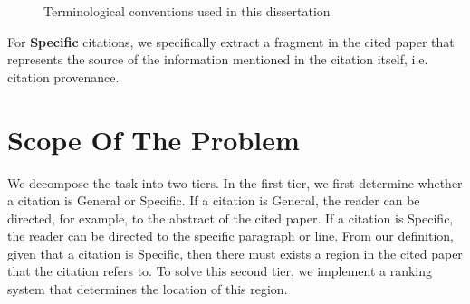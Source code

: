 \begin{figure}[h]
\label{fig:terminology}
\caption{Terminological conventions used in this dissertation}
\end{figure}

For \textbf{Specific} citations, we specifically extract a fragment in the cited paper that represents the source of the information mentioned in the citation itself, i.e. citation provenance.

\section{Scope Of The Problem}
We decompose the task into two tiers.  In the first tier, we first determine whether a citation is General or Specific. If a citation is General, the reader can be directed, for example, to the abstract of the cited paper. If a citation is Specific, the reader can be directed to the specific paragraph or line.  From our definition, given that a citation is Specific, then there must exists a region in the cited paper that the citation refers to. To solve this second tier, we implement a ranking system that determines the location of this region.

